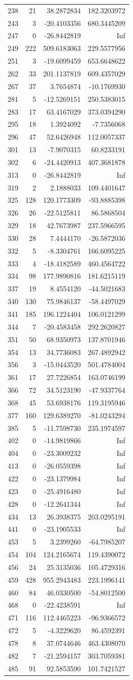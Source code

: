 \documentclass[
]{article}
\begin{document}
\begin{longtable}[]{@{}lrrr@{}}
238 & 21 & 38.2872834 & 182.3203972\tabularnewline
243 & 3 & -20.4103356 & 680.3445209\tabularnewline
247 & 0 & -26.8442819 & Inf\tabularnewline
249 & 222 & 509.6183063 & 229.5577956\tabularnewline
251 & 3 & -19.6099459 & 653.6648622\tabularnewline
262 & 33 & 201.1137819 & 609.4357029\tabularnewline
267 & 37 & 3.7654874 & -10.1769930\tabularnewline
281 & 5 & -12.5269151 & 250.5383015\tabularnewline
283 & 17 & 63.4167029 & 373.0394290\tabularnewline
295 & 18 & 1.3924092 & -7.7356068\tabularnewline
296 & 47 & 52.6426948 & 112.0057337\tabularnewline
301 & 13 & -7.9070315 & 60.8233191\tabularnewline
302 & 6 & -24.4420913 & 407.3681878\tabularnewline
313 & 0 & -26.8442819 & Inf\tabularnewline
319 & 2 & 2.1888033 & 109.4401647\tabularnewline
325 & 128 & 120.1773309 & -93.8885398\tabularnewline
326 & 26 & -22.5125811 & 86.5868504\tabularnewline
329 & 18 & 42.7673987 & 237.5966595\tabularnewline
330 & 28 & 7.4444170 & -26.5872036\tabularnewline
332 & 5 & -8.3304761 & 166.6095225\tabularnewline
333 & 4 & -18.4182589 & 460.4564722\tabularnewline
334 & 98 & 177.9890816 & 181.6215119\tabularnewline
337 & 19 & 8.4554120 & -44.5021683\tabularnewline
340 & 130 & 75.9846137 & -58.4497029\tabularnewline
341 & 185 & 196.1224404 & 106.0121299\tabularnewline
344 & 7 & -20.4583458 & 292.2620827\tabularnewline
351 & 50 & 68.9350973 & 137.8701946\tabularnewline
354 & 13 & 34.7736083 & 267.4892942\tabularnewline
356 & 3 & -15.0443520 & 501.4784004\tabularnewline
361 & 17 & 27.7226854 & 163.0746199\tabularnewline
366 & 72 & 34.5123190 & -47.9337764\tabularnewline
368 & 45 & 53.6938176 & 119.3195946\tabularnewline
377 & 160 & 129.6389270 & -81.0243294\tabularnewline
385 & 5 & -11.7598730 & 235.1974597\tabularnewline
402 & 0 & -14.9819866 & Inf\tabularnewline
404 & 0 & -23.3009232 & Inf\tabularnewline
413 & 0 & -26.0559398 & Inf\tabularnewline
422 & 0 & -23.1379984 & Inf\tabularnewline
423 & 0 & -25.4916480 & Inf\tabularnewline
428 & 0 & -12.2641344 & Inf\tabularnewline
434 & 13 & 26.3938375 & 203.0295191\tabularnewline
441 & 0 & -23.1905533 & Inf\tabularnewline
453 & 5 & 3.2399260 & -64.7985207\tabularnewline
454 & 104 & 124.2165674 & 119.4390072\tabularnewline
456 & 24 & 25.3135036 & 105.4729316\tabularnewline
459 & 428 & 955.2943483 & 223.1996141\tabularnewline
460 & 84 & 46.0330500 & -54.8012500\tabularnewline
468 & 0 & -22.4238591 & Inf\tabularnewline
471 & 116 & 112.4465223 & -96.9366572\tabularnewline
472 & 5 & -4.3229620 & 86.4592391\tabularnewline
478 & 8 & 37.0744646 & 463.4308070\tabularnewline
482 & 7 & -21.2594157 & 303.7059381\tabularnewline
485 & 91 & 92.5853590 & 101.7421527\tabularnewline

\end{longtable}
\end{document}
